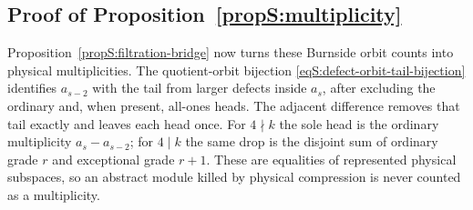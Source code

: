 \documentclass[journal,twocolumn]{IEEEtran}
\theoremstyle{definition}
\theoremstyle{plain}
\begin{document}
\subsection{Proof of Proposition~\ref{propS:multiplicity}}
\label{app:proof-multiplicity}

Proposition~\ref{propS:filtration-bridge} now turns these Burnside orbit
counts into physical multiplicities.  The quotient-orbit bijection
\eqref{eqS:defect-orbit-tail-bijection} identifies $a_{s-2}$ with the tail
from larger defects inside $a_s$, after excluding the ordinary and, when
present, all-ones heads.  The adjacent difference removes that tail exactly
and leaves each head once.  For $4\nmid k$ the sole head is
the ordinary multiplicity $a_s-a_{s-2}$; for $4\mid k$ the same drop is the
disjoint sum of ordinary grade $r$ and exceptional grade $r+1$.  These are
equalities of represented physical subspaces, so an abstract module killed by
physical compression is never counted as a multiplicity.
\end{document}
